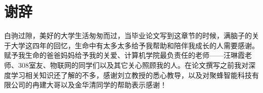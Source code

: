 \section*{谢辞}
白驹过隙，美好的大学生活匆匆而过，当毕业论文写到这章节的时候，满脑子的关于大学这四年的回忆，生命中有太多太多给予我帮助和陪伴我成长的人需要感谢。赋予我生命的爸爸妈妈给予我的关爱、计算机学院最负责任的老师——汪琳霞老师、308室友、物联网的同学们以及其它关心照顾我的人。在论文撰写之前我对深度学习相关知识还了解的不多，感谢刘立教授的悉心教导，以及对聚蜂智能科技有限公司的冉建大哥以及金华清同学的帮助表示感谢！